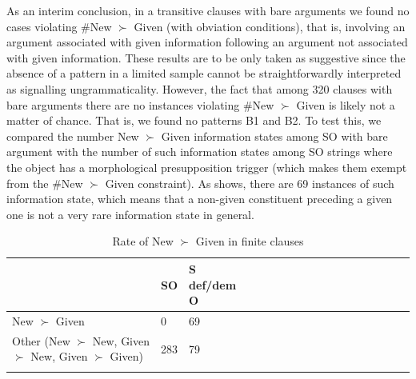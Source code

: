 \documentclass[output=paper,modfonts,nonflat]{langsci/langscibook}
\begin{document}
As an interim conclusion, in a transitive clauses with bare arguments we found no cases violating \#New $\succ$ Given (with obviation conditions), that is, involving an argument associated with given information following an argument not associated with given information. These results are to be only taken as suggestive since the absence of a pattern in a limited sample cannot be straightforwardly interpreted as signalling ungrammaticality. However, the fact that among 320 clauses with bare arguments there are no instances violating \#New $\succ$ Given is likely not a matter of chance. That is, we found no patterns B1 and B2. To test this, we compared the number New $\succ$ Given information states among SO with bare argument  with the number of such information states among SO strings where the object has a morphological presupposition trigger (which makes them exempt from the \#New $\succ$ Given constraint). As  shows, there are 69 instances of such information state, which means that a non-given constituent preceding a given one is not a very rare information state in general.




 \begin{table}
\centering
\begin{tabular}{lllllllllllllllll}
  \lsptoprule
 & SO & S def/dem O \\ 
 \midrule
New $\succ$ Given	&	0	& 69	\\
Other ({\scriptsize New $\succ$ New, Given $\succ$ New, Given $\succ$ Given}) 		&	283	&	79	\\
   \lspbottomrule
\end{tabular}
\caption{Rate of New $\succ$ Given in finite clauses}\label{table:orders}
\end{table}
\end{document}
